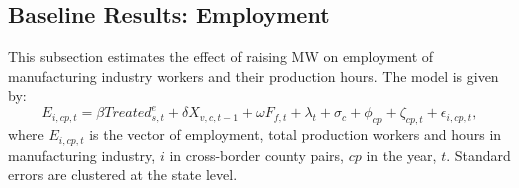 \documentclass[12pt, english]{article}
\begin{document}
    \subsection{Baseline Results: Employment}\label{subsec:baseline-results-employment}
    This subsection estimates the effect of raising MW on employment of manufacturing industry workers and their production hours. The model is given by:
    \begin{equation}
        E_{i,cp,t} = \beta Treated_{s,t}^e + \delta X_{v,c,t-1} + \omega F_{f,t} + \lambda_{t} + \sigma_{c} + \phi_{cp} + \zeta_{cp,t} + \epsilon_{i,cp,t},\label{eq:baseline-emp-hours}
    \end{equation}
    where $E_{i,cp,t}$ is the vector of employment, total production workers and hours in manufacturing industry, $i$ in cross-border county pairs, $cp$ in the year, $t$. Standard errors are clustered at the state level.
    
\end{document}
